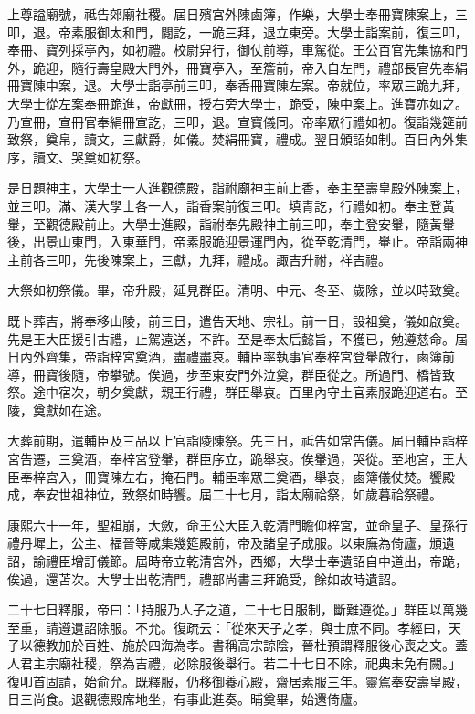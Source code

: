 \begin{pinyinscope}
上尊謚廟號，祗告郊廟社稷。屆日殯宮外陳鹵簿，作樂，大學士奉冊寶陳案上，三叩，退。帝素服御太和門，閱訖，一跪三拜，退立東旁。大學士詣案前，復三叩，奉冊、寶列採亭內，如初禮。校尉舁行，御仗前導，車駕從。王公百官先集協和門外，跪迎，隨行壽皇殿大門外，冊寶亭入，至簷前，帝入自左門，禮部長官先奉絹冊寶陳中案，退。大學士詣亭前三叩，奉香冊寶陳左案。帝就位，率眾三跪九拜，大學士從左案奉冊跪進，帝獻冊，授右旁大學士，跪受，陳中案上。進寶亦如之。乃宣冊，宣冊官奉絹冊宣訖，三叩，退。宣寶儀同。帝率眾行禮如初。復詣幾筵前致祭，奠帛，讀文，三獻爵，如儀。焚絹冊寶，禮成。翌日頒詔如制。百日內外集序，讀文、哭奠如初祭。

是日題神主，大學士一人進觀德殿，詣祔廟神主前上香，奉主至壽皇殿外陳案上，並三叩。滿、漢大學士各一人，詣香案前復三叩。填青訖，行禮如初。奉主登黃轝，至觀德殿前止。大學士進殿，詣祔奉先殿神主前三叩，奉主登安轝，隨黃轝後，出景山東門，入東華門，帝素服跪迎景運門內，從至乾清門，轝止。帝詣兩神主前各三叩，先後陳案上，三獻，九拜，禮成。諏吉升祔，祥吉禮。

大祭如初祭儀。畢，帝升殿，延見群臣。清明、中元、冬至、歲除，並以時致奠。

既卜葬吉，將奉移山陵，前三日，遣告天地、宗社。前一日，設祖奠，儀如啟奠。先是王大臣援引古禮，止駕遠送，不許。至是奉太后懿旨，不獲已，勉遵慈命。屆日內外齊集，帝詣梓宮奠酒，盡禮盡哀。輔臣率執事官奉梓宮登轝啟行，鹵簿前導，冊寶後隨，帝攀號。俟過，步至東安門外泣奠，群臣從之。所過門、橋皆致祭。途中宿次，朝夕奠獻，親王行禮，群臣舉哀。百里內守土官素服跪迎道右。至陵，奠獻如在途。

大葬前期，遣輔臣及三品以上官詣陵陳祭。先三日，祗告如常告儀。屆日輔臣詣梓宮告遷，三奠酒，奉梓宮登轝，群臣序立，跪舉哀。俟轝過，哭從。至地宮，王大臣奉梓宮入，冊寶陳左右，掩石門。輔臣率眾三奠酒，舉哀，鹵簿儀仗焚。饗殿成，奉安世祖神位，致祭如時饗。屆二十七月，詣太廟祫祭，如歲暮祫祭禮。

康熙六十一年，聖祖崩，大斂，命王公大臣入乾清門瞻仰梓宮，並命皇子、皇孫行禮丹墀上，公主、福晉等咸集幾筵殿前，帝及諸皇子成服。以東廡為倚廬，頒遺詔，諭禮臣增訂儀節。屆時帝立乾清宮外，西鄉，大學士奉遺詔自中道出，帝跪，俟過，還苫次。大學士出乾清門，禮部尚書三拜跪受，餘如故時遺詔。

二十七日釋服，帝曰：「持服乃人子之道，二十七日服制，斷難遵從。」群臣以萬幾至重，請遵遺詔除服。不允。復疏云：「從來天子之孝，與士庶不同。孝經曰，天子以德教加於百姓、施於四海為孝。書稱高宗諒陰，晉杜預謂釋服後心喪之文。蓋人君主宗廟社稷，祭為吉禮，必除服後舉行。若二十七日不除，祀典未免有闕。」復叩首固請，始俞允。既釋服，仍移御養心殿，齋居素服三年。靈駕奉安壽皇殿，日三尚食。退觀德殿席地坐，有事此進奏。晡奠畢，始還倚廬。


\end{pinyinscope}
